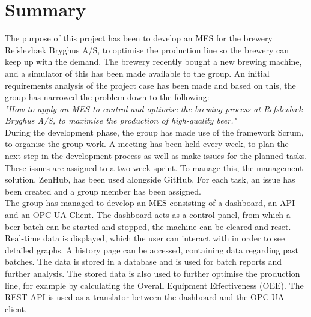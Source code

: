 \section{Summary}
The purpose of this project has been to develop an MES for the brewery
Refslevbæk Bryghus A/S, to optimise the production line so the brewery
can keep up with the demand. The brewery recently bought a new brewing machine,
and a simulator of this has been made available to the group. An initial
requirements analysis of the project case has been made and based on this, the
group has narrowed the problem down to the following:\\

\textit{"How to apply an MES to control and optimise the brewing process at
Refslevbæk Bryghus A/S, to maximise the production of high-quality beer."}\\

During the development phase, the group has made use of the framework Scrum, to
organise the group work. A meeting has been held every week, to plan the next
step in the development process as well as make issues for the planned tasks.
These issues are assigned to a two-week sprint. To manage this, the management
solution, ZenHub, has been used alongside GitHub. For each task, an issue has
been created and a group member has been assigned. \\

The group has managed to develop an MES consisting of a dashboard, an API and an
OPC-UA Client. The dashboard acts as a control panel, from which a beer batch
can be started and stopped, the machine can be cleared and reset. Real-time data
is displayed, which the user can interact with in order to see detailed graphs.
A history page can be accessed, containing data regarding past batches. The data
is stored in a database and is used for batch reports and further analysis. The
stored data is also used to further optimise the production line, for example by
calculating the Overall Equipment Effectiveness (OEE). The REST API is used as a
translator between the dashboard and the OPC-UA client.